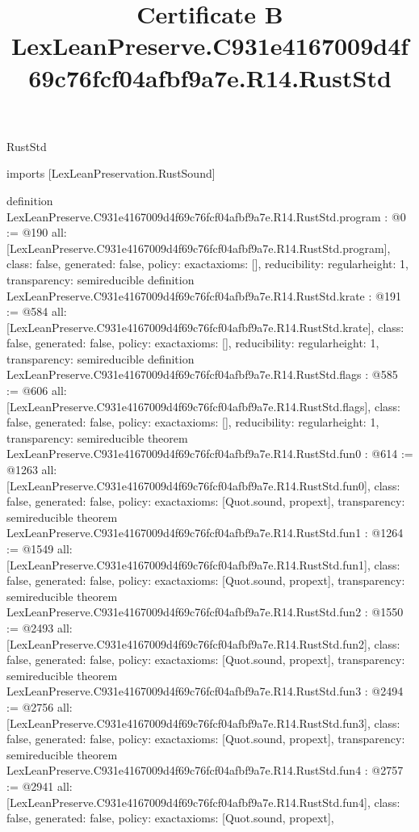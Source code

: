 \begin{lexlean}{RustStd}
\title{Certificate B LexLeanPreserve.C931e4167009d4f69c76fcf04afbf9a7e.R14.RustStd}
\begin{coremodule}
imports [LexLeanPreservation.RustSound]

definition LexLeanPreserve.C931e4167009d4f69c76fcf04afbf9a7e.R14.RustStd.program : @0 := @190 {
  all: [LexLeanPreserve.C931e4167009d4f69c76fcf04afbf9a7e.R14.RustStd.program],
  class: false,
  generated: false,
  policy: exact{axioms: []},
  reducibility: regular{height: 1},
  transparency: semireducible
}
definition LexLeanPreserve.C931e4167009d4f69c76fcf04afbf9a7e.R14.RustStd.krate : @191 := @584 {
  all: [LexLeanPreserve.C931e4167009d4f69c76fcf04afbf9a7e.R14.RustStd.krate],
  class: false,
  generated: false,
  policy: exact{axioms: []},
  reducibility: regular{height: 1},
  transparency: semireducible
}
definition LexLeanPreserve.C931e4167009d4f69c76fcf04afbf9a7e.R14.RustStd.flags : @585 := @606 {
  all: [LexLeanPreserve.C931e4167009d4f69c76fcf04afbf9a7e.R14.RustStd.flags],
  class: false,
  generated: false,
  policy: exact{axioms: []},
  reducibility: regular{height: 1},
  transparency: semireducible
}
theorem LexLeanPreserve.C931e4167009d4f69c76fcf04afbf9a7e.R14.RustStd.fun0 : @614 := @1263 {
  all: [LexLeanPreserve.C931e4167009d4f69c76fcf04afbf9a7e.R14.RustStd.fun0],
  class: false,
  generated: false,
  policy: exact{axioms: [Quot.sound, propext]},
  transparency: semireducible
}
theorem LexLeanPreserve.C931e4167009d4f69c76fcf04afbf9a7e.R14.RustStd.fun1 : @1264 := @1549 {
  all: [LexLeanPreserve.C931e4167009d4f69c76fcf04afbf9a7e.R14.RustStd.fun1],
  class: false,
  generated: false,
  policy: exact{axioms: [Quot.sound, propext]},
  transparency: semireducible
}
theorem LexLeanPreserve.C931e4167009d4f69c76fcf04afbf9a7e.R14.RustStd.fun2 : @1550 := @2493 {
  all: [LexLeanPreserve.C931e4167009d4f69c76fcf04afbf9a7e.R14.RustStd.fun2],
  class: false,
  generated: false,
  policy: exact{axioms: [Quot.sound, propext]},
  transparency: semireducible
}
theorem LexLeanPreserve.C931e4167009d4f69c76fcf04afbf9a7e.R14.RustStd.fun3 : @2494 := @2756 {
  all: [LexLeanPreserve.C931e4167009d4f69c76fcf04afbf9a7e.R14.RustStd.fun3],
  class: false,
  generated: false,
  policy: exact{axioms: [Quot.sound, propext]},
  transparency: semireducible
}
theorem LexLeanPreserve.C931e4167009d4f69c76fcf04afbf9a7e.R14.RustStd.fun4 : @2757 := @2941 {
  all: [LexLeanPreserve.C931e4167009d4f69c76fcf04afbf9a7e.R14.RustStd.fun4],
  class: false,
  generated: false,
  policy: exact{axioms: [Quot.sound, propext]},
}
\end{coremodule}
\end{lexlean}
